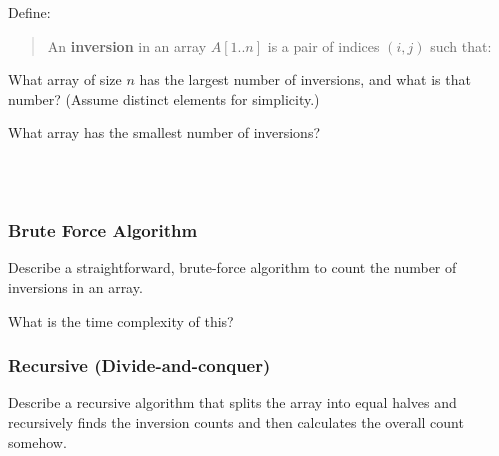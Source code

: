 \documentclass[12pt]{article}
\begin{document}
\vspace{1in}

Define:

\begin{quote}
    An \textbf{inversion} in an array $A[1..n]$ is a pair of indices $(i, j)$ such that:
\end{quote}

\vspace{1in}

\begin{minipage}{0.5\textwidth}\centering
    What array of size $n$ has the largest number of inversions, and what is that number? (Assume distinct elements for simplicity.)
\end{minipage}%
\begin{minipage}{0.5\textwidth}\centering
    What array has the smallest number of inversions?
\end{minipage}%
\\~


\clearpage
\subsubsection*{Brute Force Algorithm}

Describe a straightforward, brute-force algorithm to count the number of inversions in an array.

\begin{algorithmic}

    \LComment{\vspace{2in}}

    \EndProcedure
\end{algorithmic}

What is the time complexity of this?


\subsubsection*{Recursive (Divide-and-conquer)}

Describe a recursive algorithm that splits the array into equal halves and recursively finds the inversion counts and then calculates the overall count somehow.

\begin{algorithmic}

    \LComment{\vspace{2.25in}}

    \EndProcedure
\end{algorithmic}
\end{document}
